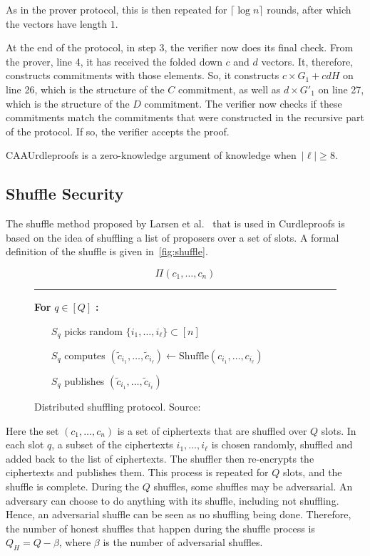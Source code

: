 As in the prover protocol, this is then repeated for $\lceil \log n \rceil$ rounds, after which the vectors have length $1$.

At the end of the protocol, in step 3, the verifier now does its final check.
From the prover, line 4, it has received the folded down $c$ and $d$ vectors.
It, therefore, constructs commitments with those elements.
So, it constructs $c\times G_1+cdH$ on line 26, which is the structure of the $C$ commitment, as well as $d\times G'_1$ on line 27, which is the structure of the $D$ commitment.
The verifier now checks if these commitments match the commitments that were constructed in the recursive part of the protocol.
If so, the verifier accepts the proof.

\begin{theorem}
    CAAUrdleproofs is a zero-knowledge argument of knowledge when~$\left|\ell\right|\geq8$.
\end{theorem}


\subsection{Shuffle Security}\label{subsec:approach-shuffle-security}
The shuffle method proposed by Larsen et al.~\cite{cryptoeprint:2022/560} that is used in Curdleproofs is based on the idea of shuffling a list of proposers over a set of slots.
A formal definition of the shuffle is given in~\autoref{fig:shuffle}.

\begin{figure}[!htb]
\begin{framed}
    \[
        \Pi(c_1, \ldots, c_n)
    \]
    \rule{\linewidth}{0.4pt}

    \noindent
    \textbf{For} $q \in [Q]$ \textbf{:}
    \begin{itemize}
        \item[$S_q$] picks random $\{i_1, \ldots, i_\ell\} \subset [n]$
        \item[$S_q$] computes $(\tilde{c}_{i_1}, \ldots, \tilde{c}_{i_\ell}) \leftarrow \text{Shuffle}(c_{i_1}, \ldots, c_{i_\ell})$
        \item[$S_q$] publishes $(\tilde{c}_{i_1}, \ldots, \tilde{c}_{i_\ell})$
    \end{itemize}
\end{framed}
\caption{Distributed shuffling protocol. Source:~\cite{cryptoeprint:2022/560}}
\label{fig:shuffle}
\end{figure}

Here the set $(c_1, \ldots, c_n)$ is a set of ciphertexts that are shuffled over $Q$ slots.
In each slot $q$, a subset of the ciphertexts ${i_1, \ldots, i_\ell}$ is chosen randomly, shuffled and added back to the list of ciphertexts.
The shuffler then re-encrypts the ciphertexts and publishes them.
This process is repeated for $Q$ slots, and the shuffle is complete.
During the $Q$ shuffles, some shuffles may be adversarial.
An adversary can choose to do anything with its shuffle, including not shuffling.
Hence, an adversarial shuffle can be seen as no shuffling being done.
Therefore, the number of honest shuffles that happen during the shuffle process is $Q_H = Q - \beta$, where $\beta$ is the number of adversarial shuffles.

